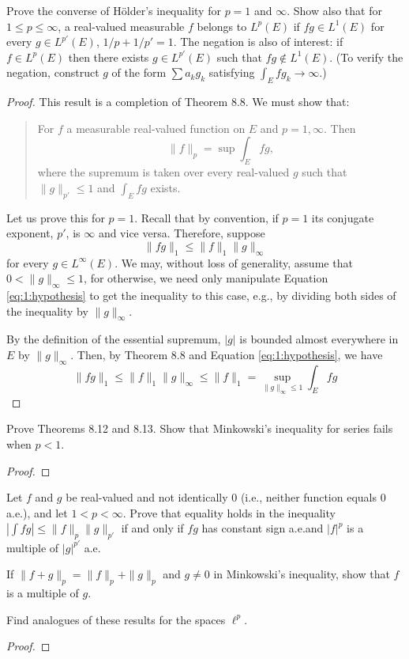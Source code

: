 
\begin{problem}
Prove the converse of Hölder's inequality for $p=1$ and $\infty$. Show also
that for $1\leq p\leq\infty$, a real-valued measurable $f$ belongs to
$L^p(E)$ if $fg\in L^1(E)$ for every $g\in L^{p'}(E)$, $1/p+1/p'=1$. The
negation is also of interest: if $f\in L^p(E)$ then there exists $g\in
L^{p'}(E)$ such that $fg\notin L^1(E)$. (To verify the negation, construct
$g$ of the form $\sum a_kg_k$ satisfying $\int_E fg_k\to\infty$.)
\end{problem}
\begin{proof}
This result is a completion of Theorem 8.8. We must show that:
\begin{quote}
For $f$ a measurable real-valued function on $E$ and $p=1,\infty$. Then
\[
\|f\|_p=\sup\int_E fg,
\]
where the supremum is taken over every real-valued $g$ such that
$\|g\|_{p'}\leq 1$ and $\int_E fg$ exists.
\end{quote}

Let us prove this for $p=1$. Recall that by convention, if $p=1$ its
conjugate exponent, $p'$, is $\infty$ and vice versa. Therefore, suppose
\begin{equation}
  \label{eq:1:hypothesis}
\|fg\|_1\leq\|f\|_1\|g\|_{\infty}
\end{equation}
for every $g\in L^\infty(E)$. We may, without loss of generality, assume
that $0<\|g\|_\infty\leq 1$, for otherwise, we need only manipulate
Equation \eqref{eq:1:hypothesis} to get the inequality to this case, e.g.,
by dividing both sides of the inequality by $\|g\|_\infty$.

 By the definition of the essential supremum,
$|g|$ is bounded almost everywhere in $E$ by $\|g\|_\infty$. Then, by
Theorem 8.8 and Equation \eqref{eq:1:hypothesis}, we have
\[
\|fg\|_1\leq \|f\|_1\|g\|_\infty\leq \|f\|_1=\sup_{\|g\|_\infty\leq 1}\int_Efg
\]
\end{proof}
\newpage

\begin{problem}
Prove Theorems 8.12 and 8.13. Show that Minkowski’s inequality for series
fails when $p<1$.
\end{problem}
\begin{proof}
\end{proof}
\newpage

\begin{problem}
Let $f$ and $g$ be real-valued and not identically $0$ (i.e., neither
function equals $0$ a.e.), and let $1<p<\infty$. Prove that equality holds
in the inequality $\left|\int fg\right|\leq\|f\|_p\|g\|_{p'}$ if and only if
$fg$ has constant sign a.e.\@ and $|f|^p$ is a multiple of $|g|^{p'}$ a.e.

If $\|f+g\|_p=\|f\|_p+\|g\|_{p}$ and $g\neq 0$ in Minkowski's inequality,
show that $f$ is a multiple of $g$.

Find analogues of these results for the spaces $\ell^p$.
\end{problem}
\begin{proof}
\end{proof}
\newpage

